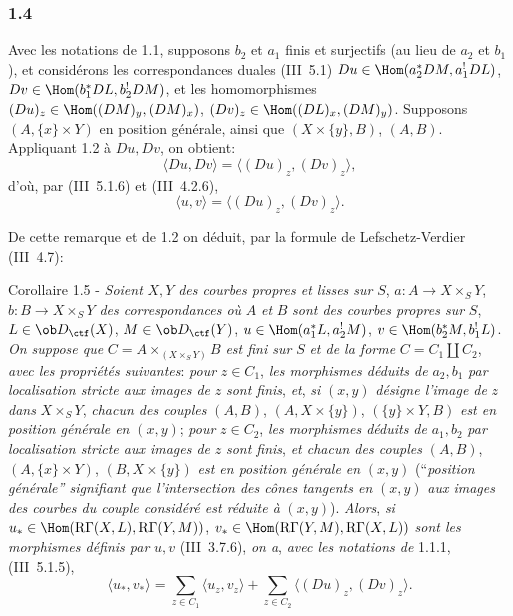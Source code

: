 \subsubsection*{1.4}
Avec les notations de 1.1, supposons $b_2$ et $a_1$ finis et surjectifs (au lieu de $a_2$ et $b_1$), et considérons les correspondances duales (III~5.1) $Du\in\Hom(a_2^*DM,a_1^!DL)$, $Dv\in\Hom(b_1^*DL,b_2^!DM)$, et les homomorphismes $(Du)_z\in\Hom((DM)_y,(DM)_x)$, $(Dv)_z\in\Hom((DL)_x,(DM)_y)$. Supposons $(A,\{x\}\times Y)$ en position générale, ainsi que $(X\times\{y\},B)$, $(A,B)$. Appliquant 1.2 à $Du,Dv$, on obtient:
\[
\langle Du,Dv\rangle=\langle (Du)_z,(Dv)_z\rangle,
\]
d'où, par (III~5.1.6) et (III~4.2.6),
\begin{equation}\tag{1.4.1}
\langle u,v\rangle=\langle (Du)_z,(Dv)_z\rangle.
\end{equation}

De
cette remarque et de 1.2 on déduit, par la formule de Lefschetz-Verdier (III~4.7):

\begin{statement}{Corollaire 1.5 -}
\emph{Soient} $X,Y$ \emph{des courbes propres et lisses sur} $S$, $a:A\longrightarrow X\times_S Y$, $b:B\longrightarrow X\times_S Y$ \emph{des correspondances où} $A$ \emph{et} $B$ \emph{sont des courbes propres sur} $S$, $L\in\ob D_{\ctf}(X)$, $M\in\ob D_{\ctf}(Y)$, $u\in\Hom(a_1^*L,a_2^!M)$, $v\in\Hom(b_2^*M,b_1^!L)$. \emph{On suppose que} $C=A\times_{(X\times_S Y)}B$ \emph{est fini sur} $S$ \emph{et de la forme} $C=C_1\amalg C_2$, \emph{avec les propriétés suivantes}: \emph{pour} $z\in C_1$, \emph{les morphismes déduits de} $a_2,b_1$ \emph{par localisation stricte aux images de} $z$ \emph{sont finis}, \emph{et}, \emph{si} $(x,y)$ \emph{désigne l'image de} $z$ \emph{dans} $X\times_S Y$, \emph{chacun des couples} $(A,B)$, $(A,X\times\{y\})$, $(\{y\}\times Y,B)$ \emph{est en position générale en} $(x,y)$; \emph{pour} $z\in C_2$, \emph{les morphismes déduits de} $a_1,b_2$ \emph{par localisation stricte aux images de} $z$ \emph{sont finis}, \emph{et chacun des couples} $(A,B)$, $(A,\{x\}\times Y)$, $(B,X\times\{y\})$ \emph{est en position générale en} $(x,y)$ (``\emph{position générale'' signifiant que l'intersection des cônes tangents en} $(x,y)$ \emph{aux images des courbes du couple considéré est réduite à} $(x,y)$). \emph{Alors}, \emph{si} $u_*\in\Hom(\mathrm{R}\Gamma(X,L),\mathrm{R}\Gamma(Y,M))$, $v_*\in\Hom(\mathrm{R}\Gamma(Y,M),\mathrm{R}\Gamma(X,L))$ \emph{sont les morphismes définis par} $u,v$ (III~3.7.6), \emph{on a}, \emph{avec les notations de} 1.1.1, (III~5.1.5),
\begin{equation}\tag{1.5.1}
\langle u_*,v_*\rangle=\sum_{z\in C_1}\langle u_z,v_z\rangle+\sum_{z\in C_2}\langle (Du)_z,(Dv)_z\rangle.
\end{equation}
\end{statement}

